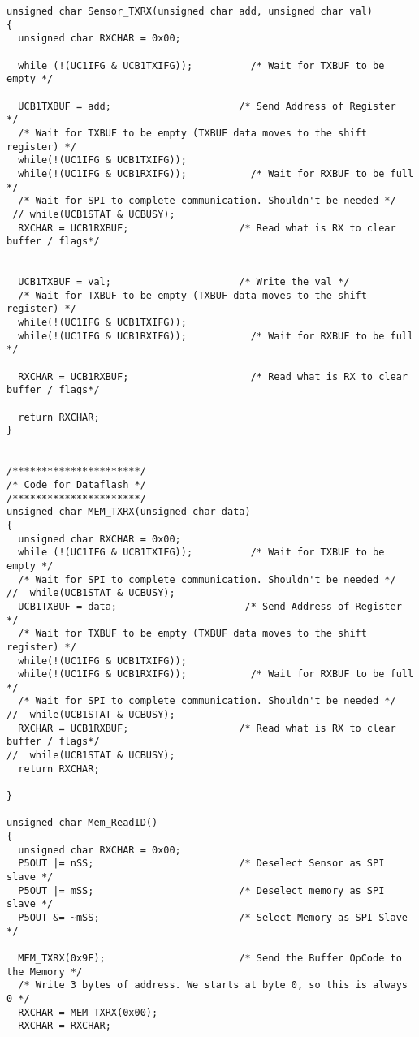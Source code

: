 \begin{lstlisting}[caption=Main.c,label=Code4]
unsigned char Sensor_TXRX(unsigned char add, unsigned char val)
{
  unsigned char RXCHAR = 0x00;
          
  while (!(UC1IFG & UCB1TXIFG));          /* Wait for TXBUF to be empty */
  
  UCB1TXBUF = add;                      /* Send Address of Register  */
  /* Wait for TXBUF to be empty (TXBUF data moves to the shift register) */
  while(!(UC1IFG & UCB1TXIFG));           
  while(!(UC1IFG & UCB1RXIFG));           /* Wait for RXBUF to be full */ 
  /* Wait for SPI to complete communication. Shouldn't be needed */
 // while(UCB1STAT & UCBUSY);             
  RXCHAR = UCB1RXBUF;                   /* Read what is RX to clear buffer / flags*/
  
  
  UCB1TXBUF = val;                      /* Write the val */      
  /* Wait for TXBUF to be empty (TXBUF data moves to the shift register) */
  while(!(UC1IFG & UCB1TXIFG));           
  while(!(UC1IFG & UCB1RXIFG));           /* Wait for RXBUF to be full */  
    
  RXCHAR = UCB1RXBUF;                     /* Read what is RX to clear buffer / flags*/
  
  return RXCHAR;
}


/**********************/
/* Code for Dataflash */
/**********************/
unsigned char MEM_TXRX(unsigned char data)
{
  unsigned char RXCHAR = 0x00;
  while (!(UC1IFG & UCB1TXIFG));          /* Wait for TXBUF to be empty */
  /* Wait for SPI to complete communication. Shouldn't be needed */
//  while(UCB1STAT & UCBUSY);             
  UCB1TXBUF = data;                      /* Send Address of Register  */
  /* Wait for TXBUF to be empty (TXBUF data moves to the shift register) */
  while(!(UC1IFG & UCB1TXIFG));           
  while(!(UC1IFG & UCB1RXIFG));           /* Wait for RXBUF to be full */ 
  /* Wait for SPI to complete communication. Shouldn't be needed */
//  while(UCB1STAT & UCBUSY);             
  RXCHAR = UCB1RXBUF;                   /* Read what is RX to clear buffer / flags*/
//  while(UCB1STAT & UCBUSY);
  return RXCHAR;
  
}

unsigned char Mem_ReadID()
{
  unsigned char RXCHAR = 0x00;
  P5OUT |= nSS;                         /* Deselect Sensor as SPI slave */ 
  P5OUT |= mSS;                         /* Deselect memory as SPI slave */ 
  P5OUT &= ~mSS;                        /* Select Memory as SPI Slave */
  
  MEM_TXRX(0x9F);                       /* Send the Buffer OpCode to the Memory */
  /* Write 3 bytes of address. We starts at byte 0, so this is always 0 */
  RXCHAR = MEM_TXRX(0x00);              
  RXCHAR = RXCHAR;
  

\end{lstlisting}
